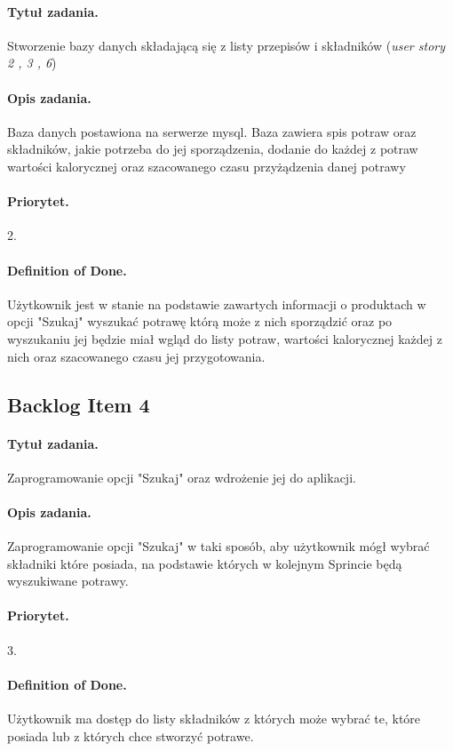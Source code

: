 \documentclass[a4paper]{article}
\begin{document}
	\paragraph{Tytuł zadania.} Stworzenie bazy danych składającą się z listy przepisów i składników (\textit{user story 2 , 3 , 6})
	\paragraph{Opis zadania.} Baza danych postawiona na serwerze mysql. Baza zawiera spis potraw oraz składników, jakie potrzeba do jej sporządzenia, dodanie do każdej z potraw wartości kalorycznej oraz szacowanego czasu przyżądzenia danej potrawy
	\paragraph{Priorytet.} 2.
	\paragraph{Definition of Done.} Użytkownik jest w stanie na podstawie zawartych informacji o produktach w opcji "Szukaj" wyszukać potrawę którą może z nich sporządzić oraz po wyszukaniu jej będzie miał wgląd do listy potraw, wartości kalorycznej każdej z nich oraz szacowanego czasu jej przygotowania.
	
	\subsection{Backlog Item 4}
	\paragraph{Tytuł zadania.} Zaprogramowanie opcji "Szukaj" oraz wdrożenie jej do aplikacji.
	\paragraph{Opis zadania.} Zaprogramowanie opcji "Szukaj" w taki sposób, aby użytkownik mógł wybrać składniki które posiada, na podstawie których w kolejnym Sprincie będą wyszukiwane potrawy.
	\paragraph{Priorytet.} 3.
	\paragraph{Definition of Done.} Użytkownik ma dostęp do listy składników z których może wybrać te, które posiada lub z których chce stworzyć potrawe.
	
\end{document}
